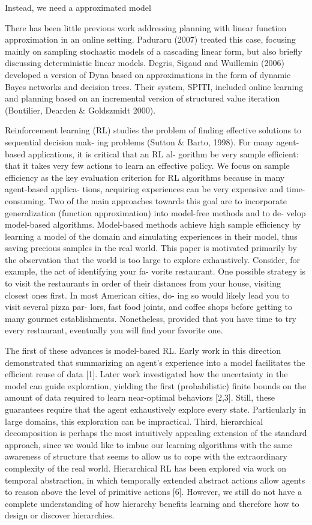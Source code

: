 \documentclass{article} %
\begin{document}
Instead, we need a approximated model

There has been little previous work addressing planning
with linear function approximation in an online setting.
Paduraru (2007) treated this case, focusing mainly on sampling
stochastic models of a cascading linear form, but
also briefly discussing deterministic linear models. Degris,
Sigaud and Wuillemin (2006) developed a version of Dyna
based on approximations in the form of dynamic Bayes networks
and decision trees. Their system, SPITI, included
online learning and planning based on an incremental version
of structured value iteration (Boutilier, Dearden &
Goldszmidt 2000).




Reinforcement learning (RL) studies the problem of
finding effective solutions to sequential decision mak-
ing problems (Sutton & Barto, 1998). For many
agent-based applications, it is critical that an RL al-
gorithm be very sample efficient: that it takes very
few actions to learn an effective policy. We focus on
sample efficiency as the key evaluation criterion for
RL algorithms because in many agent-based applica-
tions, acquiring experiences can be very expensive and
time-consuming. Two of the main approaches towards
this goal are to incorporate generalization (function
approximation) into model-free methods and to de-
velop model-based algorithms. Model-based methods
achieve high sample efficiency by learning a model of
the domain and simulating experiences in their model,
thus saving precious samples in the real world.
This paper is motivated primarily by the observation
that the world is too large to explore exhaustively.
Consider, for example, the act of identifying your fa-
vorite restaurant. One possible strategy is to visit the
restaurants in order of their distances from your house,
visiting closest ones first. In most American cities, do-
ing so would likely lead you to visit several pizza par-
lors, fast food joints, and coffee shops before getting to
many gourmet establishments. Nonetheless, provided
that you have time to try every restaurant, eventually
you will find your favorite one.

The first of these advances is model-based RL. Early work in this direction
demonstrated that summarizing an agent’s experience into a model facilitates
the efficient reuse of data [1]. Later work investigated how the uncertainty in
the model can guide exploration, yielding the first (probabilistic) finite bounds
on the amount of data required to learn near-optimal behaviors [2,3]. Still, these
guarantees require that the agent exhaustively explore every state. Particularly
in large domains, this exploration can be impractical.
Third, hierarchical decomposition is perhaps the most intuitively appealing
extension of the standard approach, since we would like to imbue our learning
algorithms with the same awareness of structure that seems to allow us to
cope with the extraordinary complexity of the real world. Hierarchical RL has
been explored via work on temporal abstraction, in which temporally extended
abstract actions allow agents to reason above the level of primitive actions [6].
However, we still do not have a complete understanding of how hierarchy benefits
learning and therefore how to design or discover hierarchies.
\end{document}
